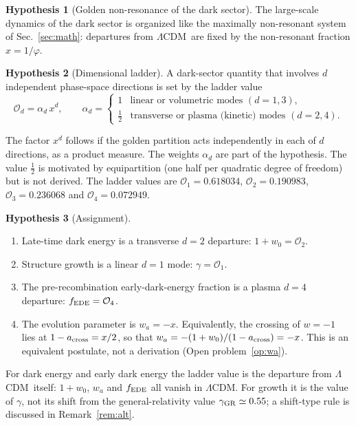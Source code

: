 \documentclass[11pt]{article}
\theoremstyle{definition}
\newtheorem{hypothesis}{Hypothesis}
\theoremstyle{remark}
\newcommand{\gr}{\varphi}
\newcommand{\LCDM}{$\Lambda$CDM}
\newcommand{\fede}{f_{\rm EDE}}
\begin{document}
\begin{hypothesis}[Golden non-resonance of the dark sector]\label{hyp:1}
The large-scale dynamics of the dark sector is organized like the maximally non-resonant system of Sec.~\ref{sec:math}: departures from \LCDM\ are fixed by the non-resonant fraction $x = 1/\gr$.
\end{hypothesis}

\begin{hypothesis}[Dimensional ladder]\label{hyp:2}
A dark-sector quantity that involves $d$ independent phase-space directions is set by the ladder value
\begin{equation}
\mathcal O_d = \alpha_d\, x^d, \qquad \alpha_d = \begin{cases} 1 & \text{linear or volumetric modes } (d = 1, 3),\\ \tfrac12 & \text{transverse or plasma (kinetic) modes } (d = 2, 4).\end{cases}
\end{equation}
\end{hypothesis}

\noindent The factor $x^d$ follows if the golden partition acts independently in each of $d$ directions, as a product measure. The weights $\alpha_d$ are part of the hypothesis. The value $\tfrac12$ is motivated by equipartition (one half per quadratic degree of freedom) but is not derived. The ladder values are $\mathcal O_1 = 0.618034$, $\mathcal O_2 = 0.190983$, $\mathcal O_3 = 0.236068$ and $\mathcal O_4 = 0.072949$.

\begin{hypothesis}[Assignment]\label{hyp:3}
\begin{enumerate}
\item Late-time dark energy is a transverse $d = 2$ departure: $1 + w_0 = \mathcal O_2$.
\item Structure growth is a linear $d = 1$ mode: $\gamma = \mathcal O_1$.
\item The pre-recombination early-dark-energy fraction is a plasma $d = 4$ departure: $\fede = \mathcal O_4$.
\item The evolution parameter is $w_a = -x$. Equivalently, the crossing of $w = -1$ lies at $1 - a_{\rm cross} = x/2$, so that $w_a = -(1+w_0)/(1 - a_{\rm cross}) = -x$. This is an equivalent postulate, not a derivation (Open problem~\ref{op:wa}).
\end{enumerate}
\end{hypothesis}

\noindent For dark energy and early dark energy the ladder value is the departure from \LCDM\ itself: $1 + w_0$, $w_a$ and $\fede$ all vanish in \LCDM. For growth it is the value of $\gamma$, not its shift from the general-relativity value $\gamma_{\rm GR} \simeq 0.55$; a shift-type rule is discussed in Remark~\ref{rem:alt}.
\end{document}
